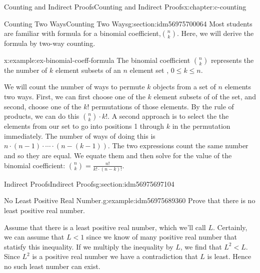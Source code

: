 \documentclass[twoside,10pt,]{book}
\numberwithin{equation}{section}
\newcommand{\lt}{<}
\begin{document}
\begin{chapterptx}{Counting and Indirect Proofs}{}{Counting and Indirect Proofs}{}{}{x:chapter:c-counting}
%
%
\typeout{************************************************}
\typeout{************************************************}
%
\begin{sectionptx}{Counting Two Ways}{}{Counting Two Ways}{}{}{g:section:idm56975700064}
Most students are familiar with formula for a binomial coefficient,\(\binom{n}{k}\). Here, we will derive the formula by two-way counting.%
\begin{example}{}{x:example:ex-binomial-coeff-formula}%
The binomial coefficient \(\binom{n}{k}\) represents the  the number of \(k\) element subsets of an \(n\) element set , \(0\leq k\leq n\).%
\par
We will count the number of ways to permute \(k\)  objects from a set of \(n\) elements two ways.  First, we can first choose one of the \(k\) element subsets of of the set, and second, choose one of the \(k!\)  permutations of those elements. By the rule of products, we can do this \(\binom{n}{k} \cdot k!\).  A second approach is to select the the elements from our set to go into positions 1 through \(k\) in the permutation immediately.  The number of ways of doing this is \(n \cdot (n-1)\cdot \cdots \cdot (n-(k-1))\).   The two expressions count the same number and so they are equal. We equate them and then solve for the value of the  binomial coefficient:  \(\binom{n}{k} =\frac{n!}{k! \cdot (n-k)!}\).%
\end{example}
\end{sectionptx}
%
%
\typeout{************************************************}
\typeout{************************************************}
%
\begin{sectionptx}{Indirect Proofs}{}{Indirect Proofs}{}{}{g:section:idm56975697104}
\begin{example}{No Least Positive Real Number.}{g:example:idm56975689360}%
Prove that there is no least positive real number.%
\par
Assume that there is a least positive real number, which we'll call \(L\).  Certainly, we can assume that \(L \lt 1\) since we know of many positive real number that statisfy this inequality.  If we multiply the inequality by \(L\), we find that \(L^2 \lt L\).  Since \(L^2\) is a positive real number we have a contradiction that \(L\) is least.  Hence no such least number can exist.%
\end{example}

\end{sectionptx}
\end{chapterptx}
\end{document}
